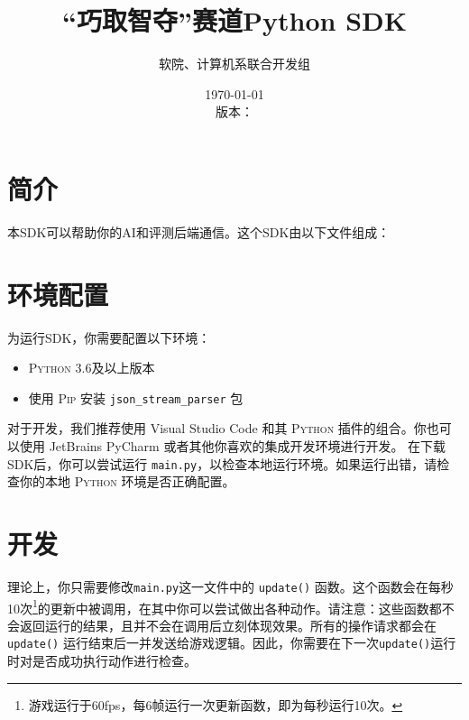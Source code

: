 \documentclass{article}
\title{“巧取智夺”赛道Python SDK}
\author{软院、计算机系联合开发组}
\date{\today\\版本：\gitAbbrevHash}
\begin{document}
\maketitle

\section{简介}

本SDK可以帮助你的AI和评测后端通信。这个SDK由以下文件组成：


\section{环境配置}

为运行SDK，你需要配置以下环境：
	\begin{itemize}\setlength\itemsep{0em}
		\item \textsc{Python} 3.6及以上版本
		\item 使用 \textsc{Pip} 安装 \texttt{json\_stream\_parser} 包
	\end{itemize}
	对于开发，我们推荐使用 Visual Studio Code 和其 \textsc{Python} 插件的组合。你也可以使用 JetBrains PyCharm 或者其他你喜欢的集成开发环境进行开发。
	在下载SDK后，你可以尝试运行 \texttt{main.py}，以检查本地运行环境。如果运行出错，请检查你的本地 \textsc{Python} 环境是否正确配置。

\section{开发}

理论上，你只需要修改\texttt{main.py}这一文件中的 \texttt{update()} 函数。这个函数会在每秒10次\footnote{游戏运行于60fps，每6帧运行一次更新函数，即为每秒运行10次。}的更新中被调用，在其中你可以尝试做出各种动作。请注意：这些函数都不会返回运行的结果，且并不会在调用后立刻体现效果。所有的操作请求都会在 \texttt{update()} 运行结束后一并发送给游戏逻辑。因此，你需要在下一次\texttt{update()}运行时对是否成功执行动作进行检查。
\end{document}
